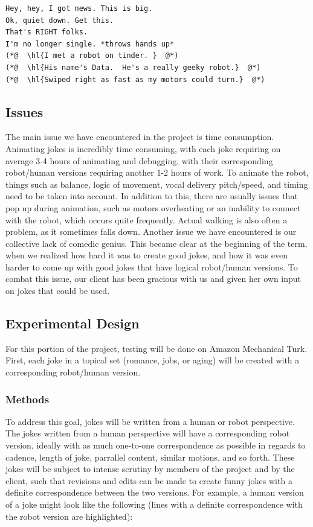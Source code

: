 \documentclass[onecolumn, draftclsnofoot,10pt, compsoc]{IEEEtran}
\begin{document}
\begin{lstlisting}
Hey, hey, I got news. This is big.
Ok, quiet down. Get this.
That's RIGHT folks.
I'm no longer single. *throws hands up*
(*@  \hl{I met a robot on tinder. }  @*)
(*@  \hl{His name's Data.  He's a really geeky robot.}  @*)
(*@  \hl{Swiped right as fast as my motors could turn.}  @*)
\end{lstlisting}

\subsection{Issues}
The main issue we have encountered in the project is time consumption.
Animating jokes is incredibly time consuming, with each joke requiring on average 3-4 hours of animating and debugging, with their corresponding robot/human versions requiring another 1-2 hours of work. To animate the robot, things such as balance, logic of movement, vocal delivery pitch/speed, and timing need to be taken into account. In addition to this, there are usually issues that pop up during animation, such as motors overheating or an inability to connect with the robot, which occurs quite frequently. Actual walking is also often a problem, as it sometimes falls down.
Another issue we have encountered is our collective lack of comedic genius. This became clear at the beginning of the term, when we realized how hard it was to create good jokes, and how it was even harder to come up with good jokes that have logical robot/human versions. To combat this issue, our client has been gracious with us and given her own input on jokes that could be used.
\subsection{Experimental Design}
For this portion of the project, testing will be done on Amazon Mechanical Turk.
First, each joke in a topical set (romance, jobs, or aging) will be created with a corresponding robot/human version.


\subsubsection{Methods}
To address this goal, jokes will be written from a human or robot perspective.
The jokes written from a human perspective will have a corresponding robot version, ideally with as much one-to-one correspondence as possible in regards to cadence, length of joke, parrallel content, similar motions, and so forth.
These jokes will be subject to intense scrutiny by members of the project and by the client, such that revisions and edits can be made to create funny jokes with a definite correspondence between the two versions.
For example, a human version of a joke might look like the following (lines with a definite correspondence with the robot version are highlighted):
\end{document}
